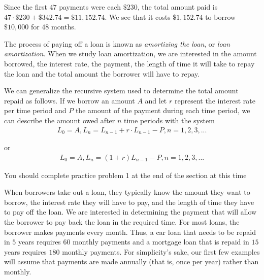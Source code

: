\documentclass[10pt,]{book}
\theoremstyle{plain}
\theoremstyle{definition}
\theoremstyle{definition}
\theoremstyle{definition}
\numberwithin{equation}{section}
\begin{document}
\par
Since the first \(47\) payments were each \(\$230\), the total amount paid is \(47\cdot \$230 + \$342.74 = \$11,152.74\).  We see that it costs \(\$1,152.74\) to borrow \(\$10,000\) for \(48\) months.%
\par
The process of paying off a loan is known as \emph{amortizing the loan}, or \emph{loan amortization}. When we study loan amortization, we are interested in the amount borrowed, the interest rate, the payment, the length of time it will take to repay the loan and the total amount the borrower will have to repay.%
\par
We can generalize the recursive system used to determine the total amount repaid as follows.  If we borrow an amount \(A\) and let \(r\) represent the interest rate per time period and \(P\) the amount of the payment during each time period, we can describe the amount owed after \(n\) time periods with the system%
%
\begin{gather*}
L_0=A, L_n=L_{n-1} + r \cdot L_{n-1} - P , n=1,2,3,...
\end{gather*}
\par
or%
%
\begin{gather*}
L_0=A,L_n=(1+r)L_{n-1} - P , n=1,2,3,...
\end{gather*}
\par
You should complete practice problem 1 at the end of the section at this time%
\par
When borrowers take out a loan, they typically know the amount they want to borrow, the interest rate they will have to pay, and the length of time they have to pay off the loan.  We are interested in determining the payment that will allow the borrower to pay back the loan in the required time.  For most loans, the borrower makes payments every month. Thus, a car loan that needs to be repaid in \(5\) years requires \(60\) monthly payments and a mortgage loan that is repaid in \(15\) years requires \(180\) monthly payments. For simplicity's sake, our first few examples will assume that payments are made annually (that is, once per year) rather than monthly.%
\end{document}
